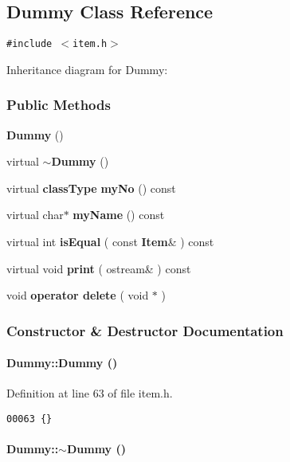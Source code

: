 \subsection{Dummy  Class Reference}
\label{Dummy}
{\tt \#include $<$item.h$>$}

Inheritance diagram for Dummy:\begin{figure}[H]
\begin{center}
\leavevmode
\setlength{\epsfysize}{2cm}
\end{center}
\end{figure}
\subsubsection*{Public Methods}
\begin{CompactItemize}
\item 
{\bf Dummy} ()
\item 
virtual {\bf $\sim$Dummy} ()
\item 
virtual {\bf class\-Type} {\bf my\-No} () const
\item 
virtual char$\ast$ {\bf my\-Name} () const
\item 
virtual int {\bf is\-Equal} ( const {\bf Item}\& ) const
\item 
virtual void {\bf print} ( ostream\& ) const
\item 
void {\bf operator delete} ( void $\ast$ )
\end{CompactItemize}


\subsubsection{Constructor \& Destructor Documentation}
\label{Dummy_a0}
\paragraph{\setlength{\rightskip}{0pt plus 5cm}Dummy::Dummy ()\hspace{0.3cm}{\tt  [inline]}}\hfill



Definition at line 63 of file item.h.\small\begin{verbatim}00063 {}
\end{verbatim}\normalsize 
\label{Dummy_a1}
\paragraph{\setlength{\rightskip}{0pt plus 5cm}Dummy::$\sim$Dummy ()\hspace{0.3cm}{\tt  [virtual]}}\hfill



